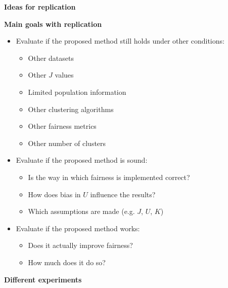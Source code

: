 \documentclass{article}
\begin{document}
{\Large \textbf{Ideas for replication}}

\bigskip

\textbf{Main goals with replication}

\begin{itemize}
    \item Evaluate if the proposed method still holds under other conditions:
    \begin{itemize}
        \item Other datasets
        \item Other $J$ values
        \item Limited population information
        \item Other clustering algorithms
        \item Other fairness metrics
        \item Other number of clusters
    \end{itemize}
    \item Evaluate if the proposed method is sound:
    \begin{itemize}
        \item Is the way in which fairness is implemented correct?
        \item How does bias in $U$ influence the results?
        \item Which assumptions are made (e.g. $J$, $U$, $K$)
    \end{itemize}
    \item Evaluate if the proposed method works:
    \begin{itemize}
        \item Does it actually improve fairness?
        \item How much does it do so?
    \end{itemize}
\end{itemize}

\textbf{Different experiments}
\end{document}
